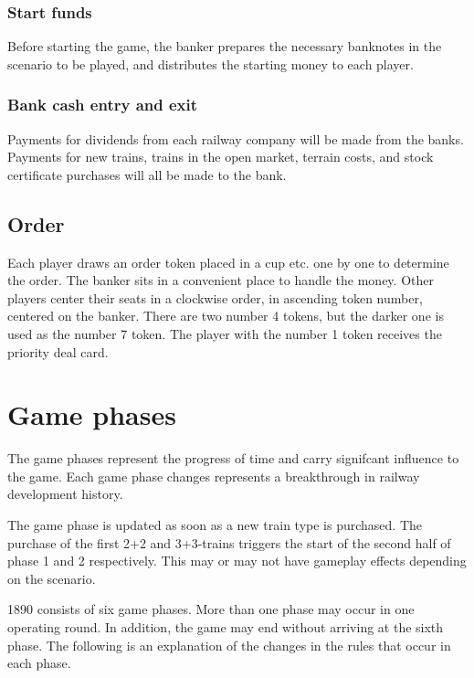 \documentclass{article}
\begin{document}
\begin{CJK}{UTF8}{min}
\begin{multicols}{2}
\subsubsection{Start funds}
Before starting the game, the banker prepares the necessary banknotes
in the scenario to be played, and distributes the starting money to each player.

\subsubsection{Bank cash entry and exit}
Payments for dividends from each railway company will be made from the
banks. Payments for new trains, trains in the open market, terrain
costs, and stock certificate purchases will all be made to the bank.

\subsection{Order}
Each player draws an order token placed in a cup etc. one by one to
determine the order. The banker sits in a convenient place to handle
the money. Other players center their seats in a clockwise order, in
ascending token number, centered on the banker. There are two number 4
tokens, but the darker one is used as the number 7 token. The player
with the number 1 token receives the priority deal card.


\section{Game phases} \label{sec:game-phases}
The game phases represent the progress of time and carry signifcant
influence to the game. Each game phase changes represents a
breakthrough in railway development history.

The game phase is updated as soon as a new train type is purchased.
The purchase of the first 2+2 and 3+3-trains triggers the start of the
second half of phase 1 and 2 respectively. This may or may not have
gameplay effects depending on the scenario.

1890 consists of six game phases. More than one phase may occur in
one operating round. In addition, the game may end without arriving at
the sixth phase. The following is an explanation of the changes in the
rules that occur in each phase.


\end{multicols}
\end{CJK}
\end{document}
